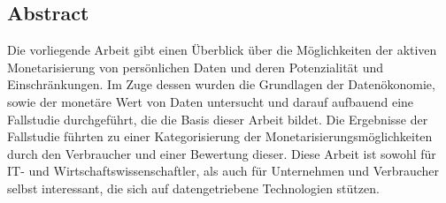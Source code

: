 \thispagestyle{empty}
\vspace*{5cm}
\begin{center}
\begin{minipage}{0.9\textwidth}
\chapter*{Abstract}

Die vorliegende Arbeit gibt einen Überblick über die Möglichkeiten der aktiven Monetarisierung von persönlichen Daten und deren Potenzialität und Einschränkungen. Im Zuge dessen wurden die Grundlagen der Datenökonomie, sowie der monetäre Wert von Daten untersucht und darauf aufbauend eine Fallstudie durchgeführt, die die Basis dieser Arbeit bildet. Die Ergebnisse der Fallstudie führten zu einer Kategorisierung der Monetarisierungsmöglichkeiten durch den Verbraucher und einer Bewertung dieser. Diese Arbeit ist sowohl für IT- und Wirtschaftswissenschaftler, als auch für Unternehmen und Verbraucher selbst interessant, die sich auf datengetriebene Technologien stützen.

\vspace*{1.5cm}
\end{minipage}
\end{center}
\clearpage
